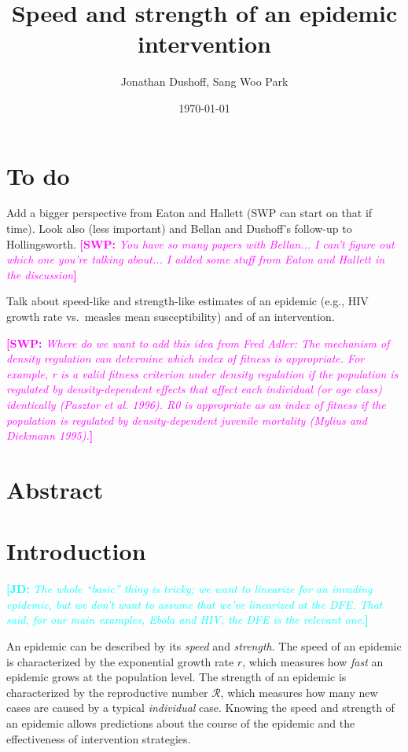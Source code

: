\documentclass[12pt]{article}
\title{Speed and strength of an epidemic intervention}
\author{Jonathan Dushoff, Sang Woo Park}
\date{\today}
\newcommand{\comment}[3]{\textcolor{#1}{\textbf{[#2: }\textit{#3}\textbf{]}}}
\newcommand{\jd}[1]{\comment{cyan}{JD}{#1}}
\newcommand{\swp}[1]{\comment{magenta}{SWP}{#1}}
\newcommand{\RR}{\ensuremath{{\mathcal R}}}
\begin{document}
\maketitle

\section*{To do}

Add a bigger perspective from Eaton and Hallett (SWP can start on that if time). Look also (less important) and Bellan and Dushoff's follow-up to Hollingsworth. \swp{You have so many papers with Bellan... I can't figure out which one you're talking about... I added some stuff from Eaton and Hallett in the discussion}

Talk about speed-like and strength-like estimates of an epidemic (e.g., HIV growth rate vs.~measles mean susceptibility) and of an intervention.

\swp{Where do we want to add this idea from Fred Adler: The mechanism of density regulation can determine which index of fitness
is appropriate. For example, r is a valid fitness criterion under
density regulation if the population is regulated by density-dependent
effects that affect each individual (or age class) identically (Pasztor
et al. 1996). R0 is appropriate as an index of fitness if the population
is regulated by density-dependent juvenile mortality (Mylius and
Diekmann 1995).}

\section*{Abstract}



\section{Introduction}

\jd{The whole ``basic'' thing is tricky; we want to linearize for an invading epidemic, but we don't want to assume that we've linearized at the DFE. That said, for our main examples, Ebola and HIV, the DFE is the relevant one.}

An epidemic can be described by its \emph{speed} and \emph{strength}.
The speed of an epidemic is characterized by the exponential growth rate $r$, which measures how \emph{fast} an epidemic grows at the population level.
The strength of an epidemic is characterized by the reproductive number \RR, which measures how many new cases are caused by a typical \emph{individual} case.
Knowing the speed and strength of an epidemic allows predictions about the course of the epidemic and the effectiveness of intervention strategies.
\end{document}
